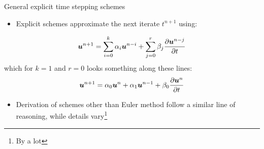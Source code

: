 \documentclass[presentation]{beamer}
\newcommand{\gv}[1]{\ensuremath{\mbox{\boldmath$ #1 $}}}
\begin{document}
\begin{frame}[label={sec:org77cff7e}]{General explicit time stepping schemes}
\begin{itemize}
\item Explicit schemes approximate the next iterate \(t^{n+1}\) using:
\end{itemize}
\[ \gv{u}^{n+1} = \sum_{i=0}^{k} \alpha_i \gv{u}^{n-i} + \sum_{j=0}^{r} \beta_j \frac{\partial \gv{u}^{n-j}}{\partial t} \]
  which for \(k=1\) and \(r=0\) looks something along these lines:
\[ \gv{u}^{n+1} = \alpha_0 \gv{u}^{n} + \alpha_1 \gv{u}^{n-1} + \beta_0 \frac{\partial \gv{u}^{n}}{\partial t} \]
\begin{itemize}
\item Derivation of schemes other than Euler method follow a similar line of reasoning, while
details vary\footnote{By a \alert{lot}}
\end{itemize}
\end{frame}
\end{document}
